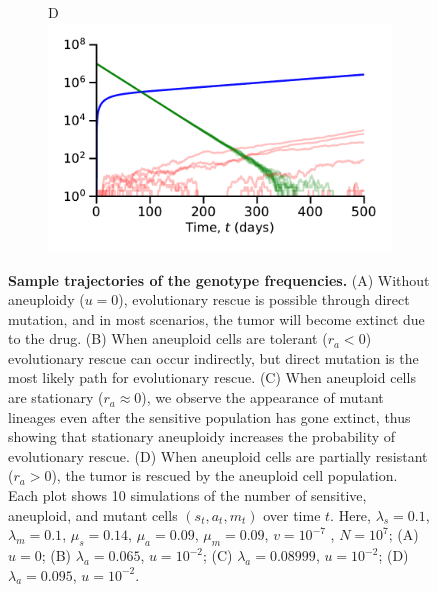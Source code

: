 \documentclass[12pt]{extarticle}
\renewcommand{\Delta}{r}
\begin{document}
\begin{figure}
\begin{subfigure}{0.5\textwidth}
\end{subfigure}
\begin{subfigure}{0.5\textwidth}
D\\
\includegraphics[width=1\textwidth]{Figures/TauLeapMeanTimeDiagramlargeda.pdf}
\end{subfigure}
\caption{
\textbf{Sample trajectories of the genotype frequencies.}
(A) Without aneuploidy ($u=0$), evolutionary rescue is possible through direct mutation, and in most scenarios, the tumor will become extinct due to the drug. (B) When aneuploid cells are tolerant ($\Delta_a<0$) evolutionary rescue can occur indirectly, but direct mutation is the most likely path for evolutionary rescue. %
(C) When aneuploid cells are stationary ($\Delta_a\approx0$), we observe the appearance of mutant lineages even after the sensitive population has gone extinct, thus showing that stationary aneuploidy increases the probability of evolutionary rescue. (D) When aneuploid cells are partially resistant ($\Delta_a>0$), the tumor is rescued by the aneuploid cell population. Each plot shows 10 simulations of the number of sensitive, aneuploid, and mutant cells $\left(s_t,a_t,m_t\right)$ over time $t$.
Here, $\lambda_s=0.1$, $\lambda_m=0.1$, $\mu_s=0.14$, $\mu_a=0.09$, $\mu_m=0.09$, $v=10^{-7}$ , $N=10^7$; (A) $u=0$; (B) $\lambda_a=0.065$, $u=10^{-2}$; (C) $\lambda_a=0.08999$, $u=10^{-2}$; (D) $\lambda_a=0.095$, $u=10^{-2}$.
}
\label{sampleTrajectories}
\end{figure}

\end{document}
